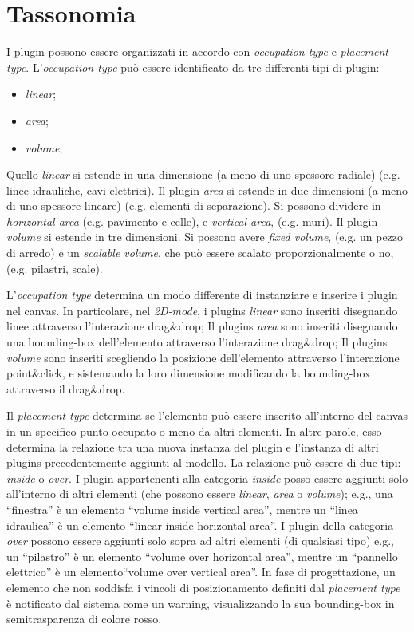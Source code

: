 \section{Tassonomia}
\label{sec:chapter_3_section_2}

\noindent
I plugin possono essere organizzati in accordo con \emph{occupation type} e \emph{placement type}.
L'\emph{occupation type} può essere identificato da tre differenti tipi di plugin:
\begin{itemize}
  \item \emph{linear};
  \item \emph{area};
  \item \emph{volume};
\end{itemize}
Quello \emph{linear} si estende in una dimensione (a meno di uno spessore radiale) (e.g. linee idrauliche, cavi elettrici).
Il plugin \emph{area} si estende in due dimensioni (a meno di uno spessore lineare) (e.g. elementi di separazione).
Si possono dividere in \emph{horizontal area} (e.g. pavimento e celle), e \emph{vertical area}, (e.g. muri).
Il plugin \emph{volume} si estende in tre dimensioni. Si possono avere \emph{fixed volume}, (e.g. un pezzo di arredo) e
un \emph{scalable volume}, che può essere scalato proporzionalmente o no, (e.g. pilastri, scale).


L'\emph{occupation type} determina un modo differente di instanziare e inserire i plugin nel canvas.
In particolare, nel \emph{2D-mode}, i plugins \emph{linear} sono inseriti disegnando linee attraverso l'interazione drag\&drop;
Il plugins \emph{area} sono inseriti disegnando una bounding-box dell'elemento attraverso l'interazione drag\&drop;
Il plugins \emph{volume} sono inseriti scegliendo la posizione dell'elemento attraverso l'interazione point\&click,
e sistemando la loro dimensione modificando la bounding-box attraverso il drag\&drop.


Il \emph{placement type} determina se l'elemento può essere inserito all'interno del canvas in un specifico punto occupato o meno
da altri elementi. In altre parole, esso determina la relazione tra una nuova instanza del plugin e l'instanza di altri
plugins precedentemente aggiunti al modello. La relazione può essere di due tipi: \emph{inside} o \emph{over}.
I plugin appartenenti alla categoria \emph{inside} posso essere aggiunti solo all'interno di altri elementi (che possono essere
\emph{linear}, \emph{area} o \emph{volume}); e.g., una ``finestra'' è un elemento ``volume inside vertical area'',
mentre un ``linea idraulica'' \`e un elemento ``linear inside horizontal area''.
I plugin della categoria \emph{over} possono essere aggiunti solo sopra ad altri elementi (di qualsiasi tipo)
e.g., un ``pilastro'' \`e un elemento ``volume over horizontal area'',
mentre un ``pannello elettrico'' è un elemento``volume over vertical area''.
In fase di progettazione, un elemento che non soddisfa i vincoli di posizionamento definiti dal \emph{placement type} \`e
notificato dal sistema come un warning, visualizzando la sua bounding-box in semitrasparenza di colore rosso.
\newpage
